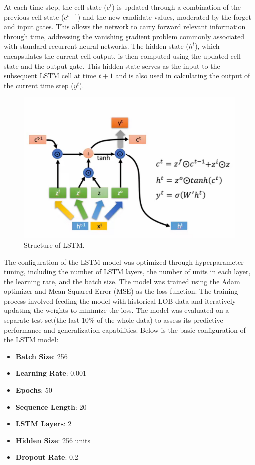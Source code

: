 \documentclass[conference]{IEEEtran}
\begin{document}
At each time step, the cell state (\( c^t \)) is updated through a combination of the previous cell state (\( c^{t-1} \)) and the new candidate values, moderated by the forget and input gates. This allows the network to carry forward relevant information through time, addressing the vanishing gradient problem commonly associated with standard recurrent neural networks. The hidden state (\( h^t \)), which encapsulates the current cell output, is then computed using the updated cell state and the output gate. This hidden state serves as the input to the subsequent LSTM cell at time \( t+1 \) and is also used in calculating the output of the current time step (\( y^t \)).


\begin{figure}[!ht]
\begin{center}
\includegraphics[width=\linewidth]{./img/lstm_structure.png}
\caption{Structure of LSTM.}
\label{fig.1}
\end{center}
\end{figure}

The configuration of the LSTM model was optimized through hyperparameter tuning, including the number of LSTM layers, the number of units in each layer, the learning rate, and the batch size. The model was trained using the Adam optimizer and Mean Squared Error (MSE) as the loss function. The training process involved feeding the model with historical LOB data and iteratively updating the weights to minimize the loss.
The model was evaluated on a separate test set(the last 10\% of the whole data) to assess its predictive performance and generalization capabilities.
Below is the basic configuration of the LSTM model:
\begin{itemize}
    \item \textbf{Batch Size}: 256
    \item \textbf{Learning Rate}: 0.001
    \item \textbf{Epochs}: 50
    \item \textbf{Sequence Length}: 20
    \item \textbf{LSTM Layers}: 2
    \item \textbf{Hidden Size}: 256 units
    \item \textbf{Dropout Rate}: 0.2
\end{itemize}
\end{document}
